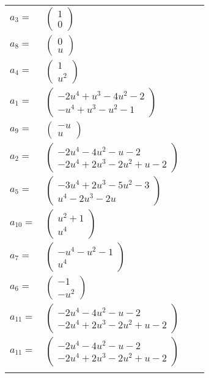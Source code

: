 \documentclass[1p]{elsarticle_modified}
\theoremstyle{definition}
\begin{document}
\begin{tabular}{m{7pt} m{180pt} m{7pt} m{180pt} }
\flushright $a_{3}=$&$\begin{pmatrix}1\\0\end{pmatrix}$ \\
\flushright $a_{8}=$&$\begin{pmatrix}0\\u\end{pmatrix}$ \\
\flushright $a_{4}=$&$\begin{pmatrix}1\\u^2\end{pmatrix}$ \\
\flushright $a_{1}=$&$\begin{pmatrix}-2 u^4+u^3-4 u^2-2\\- u^4+u^3- u^2-1\end{pmatrix}$ \\
\flushright $a_{9}=$&$\begin{pmatrix}- u\\u\end{pmatrix}$ \\
\flushright $a_{2}=$&$\begin{pmatrix}-2 u^4-4 u^2- u-2\\-2 u^4+2 u^3-2 u^2+u-2\end{pmatrix}$ \\
\flushright $a_{5}=$&$\begin{pmatrix}-3 u^4+2 u^3-5 u^2-3\\u^4-2 u^3-2 u\end{pmatrix}$ \\
\flushright $a_{10}=$&$\begin{pmatrix}u^2+1\\u^4\end{pmatrix}$ \\
\flushright $a_{7}=$&$\begin{pmatrix}- u^4- u^2-1\\u^4\end{pmatrix}$ \\
\flushright $a_{6}=$&$\begin{pmatrix}-1\\- u^2\end{pmatrix}$ \\
\flushright $a_{11}=$&$\begin{pmatrix}-2 u^4-4 u^2- u-2\\-2 u^4+2 u^3-2 u^2+u-2\end{pmatrix}$\\ \flushright $a_{11}=$&$\begin{pmatrix}-2 u^4-4 u^2- u-2\\-2 u^4+2 u^3-2 u^2+u-2\end{pmatrix}$\\&\end{tabular}
\end{document}

